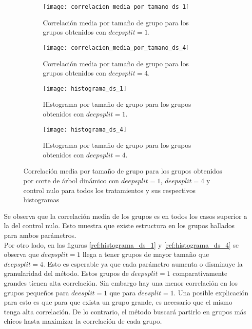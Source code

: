 \begin{figure*}[t!]
    \centering
    \begin{subfigure}[t]{0.45\textwidth}
    \centering
    \texttt{[image: correlacion\_media\_por\_tamano\_ds\_1]}
    \caption{Correlación media por tamaño de grupo para los grupos obtenidos con $deepsplit=1$.}
    \label{fig:correlacion_media_por_tamano_ds_1}
    \end{subfigure}
    \begin{subfigure}[t]{0.45\textwidth}
    \centering
    \texttt{[image: correlacion\_media\_por\_tamano\_ds\_4]}
    \caption{Correlación media por tamaño de grupo para los grupos obtenidos con $deepsplit=4$.}
    \label{fig:correlacion_media_por_tamano_ds_4}
    \end{subfigure}
    \centering
    \begin{subfigure}[t]{0.45\textwidth}
    \centering
    \texttt{[image: histograma\_ds\_1]}
    \caption{Histograma por tamaño de grupo para los grupos obtenidos con $deepsplit=1$.}
    \label{fig:histograma_ds_1}
    \end{subfigure}
    \begin{subfigure}[t]{0.45\textwidth}
    \centering
    \texttt{[image: histograma\_ds\_4]}
    \caption{Histograma por tamaño de grupo para los grupos obtenidos con $deepsplit=4$.}
    \label{fig:histograma_ds_4}
    \end{subfigure}    
    \caption{Correlación media por tamaño de grupo para los grupos obtenidos por corte de árbol dinámico con $deepsplit=1$, $deepsplit=4$ y control nulo para todos los tratamientos y sus respectivos histogramas}
\end{figure*}
Se observa que la correlación media de los grupos es en todos los casos superior a la del control nulo. Esto muestra que existe estructura en los grupos hallados para ambos parámetros. \\
Por otro lado, en las figuras \ref{ref:histograma_ds_1} y \ref{ref:histograma_ds_4} se observa que $deepsplit=1$ llega a tener grupos de mayor tamaño que $deepsplit=4$. Esto es esperable ya que cada parámetro aumenta o disminuye la granularidad del método. Estos grupos de $deepsplit=1$ comparativamente grandes tienen alta correlación. Sin embargo hay una menor correlación en los grupos pequeños para $deesplit=1$ que para $deesplit=1$. Una posible explicación para esto es que para que exista un grupo grande, es necesario que el mismo tenga alta correlación. De lo contrario, el método buscará partirlo en grupos más chicos hasta maximizar la correlación de cada grupo.\\

